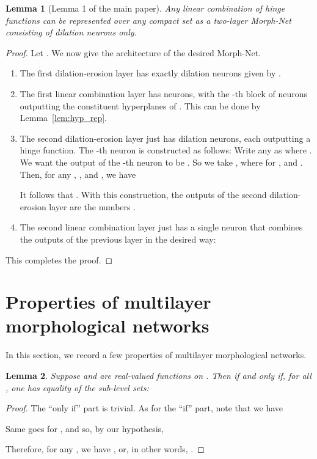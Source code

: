 \documentclass[12pt]{article}
\newtheorem{lemma}{Lemma}
\begin{document}
\begin{lemma}[Lemma 1 of the main paper]
Any linear combination of hinge functions  can be represented over any compact set  as a two-layer Morph-Net consisting of dilation neurons only.
\end{lemma}
\begin{proof}
Let . We now give the architecture of the desired Morph-Net.
\begin{enumerate}
    \item The first dilation-erosion layer has exactly  dilation neurons given by .
    \item The first linear combination layer has  neurons, with the -th block of  neurons outputting the constituent hyperplanes of . This can be done by Lemma~\ref{lem:hyp_rep}.
    \item The second dilation-erosion layer just has  dilation neurons, each outputting a hinge function. The -th neuron is constructed as follows: Write any  as  where .  We want the output of the -th neuron to be . So we take , where  for , and . Then, for any , , and , we have
    
    It follows that . With this construction, the outputs of the second dilation-erosion layer are the  numbers .
    \item The second linear combination layer just has a single neuron that combines the outputs of the previous layer in the desired way:
    
\end{enumerate}
This completes the proof.
\end{proof}

\section{Properties of multilayer morphological networks}
In this section, we record a few properties of multilayer morphological networks.
\begin{lemma}
Suppose  and  are real-valued functions on . Then  if and only if, for all , one has equality of the sub-level sets:

\label{lemma_feqg}
\end{lemma}
\begin{proof}
The ``only if'' part is trivial. As for the ``if'' part, note that we have

Same goes for , and so, by our hypothesis,

Therefore, for any , we have , or, in other words, .
\end{proof}
\end{document}
